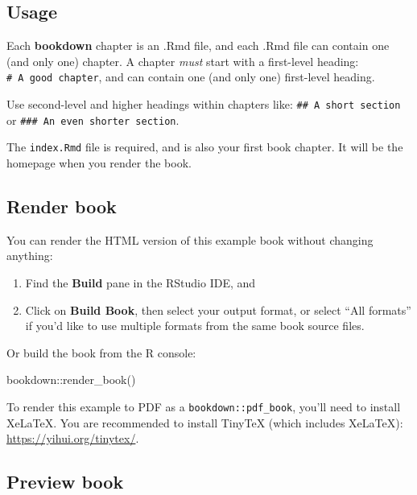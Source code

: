\documentclass[
]{book}
\newenvironment{Shaded}{\begin{snugshade}}{\end{snugshade}}
\newcommand{\FunctionTok}[1]{\textcolor[rgb]{0.00,0.00,0.00}{#1}}
\newcommand{\NormalTok}[1]{#1}
\newcommand{\SpecialCharTok}[1]{\textcolor[rgb]{0.00,0.00,0.00}{#1}}
\theoremstyle{definition}
\theoremstyle{definition}
\theoremstyle{definition}
\theoremstyle{definition}
\theoremstyle{remark}
\begin{document}
\hypertarget{usage}{%
\subsection{Usage}\label{usage}}

Each \textbf{bookdown} chapter is an .Rmd file, and each .Rmd file can contain one (and only one) chapter. A chapter \emph{must} start with a first-level heading: \texttt{\#\ A\ good\ chapter}, and can contain one (and only one) first-level heading.

Use second-level and higher headings within chapters like: \texttt{\#\#\ A\ short\ section} or \texttt{\#\#\#\ An\ even\ shorter\ section}.

The \texttt{index.Rmd} file is required, and is also your first book chapter. It will be the homepage when you render the book.

\hypertarget{render-book}{%
\subsection{Render book}\label{render-book}}

You can render the HTML version of this example book without changing anything:

\begin{enumerate}
\def\labelenumi{\arabic{enumi}.}
\item
  Find the \textbf{Build} pane in the RStudio IDE, and
\item
  Click on \textbf{Build Book}, then select your output format, or select ``All formats'' if you'd like to use multiple formats from the same book source files.
\end{enumerate}

Or build the book from the R console:

\begin{Shaded}
\begin{Highlighting}[]
\NormalTok{bookdown}\SpecialCharTok{::}\FunctionTok{render\_book}\NormalTok{()}
\end{Highlighting}
\end{Shaded}

To render this example to PDF as a \texttt{bookdown::pdf\_book}, you'll need to install XeLaTeX. You are recommended to install TinyTeX (which includes XeLaTeX): \url{https://yihui.org/tinytex/}.

\hypertarget{preview-book}{%
\subsection{Preview book}\label{preview-book}}
\end{document}

